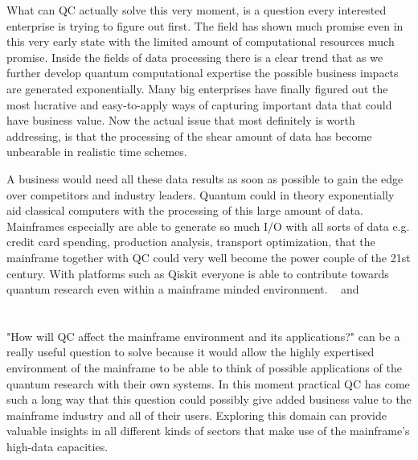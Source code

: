 What can QC actually solve this very moment, is a question every interested enterprise is trying to figure out first. The field has shown much promise even in this very early state with the limited amount of computational resources much promise. Inside the fields of data processing there is a clear trend that as we further develop quantum computational expertise the possible business impacts are generated exponentially. Many big enterprises have finally figured out the most lucrative and easy-to-apply ways of capturing important data that could have business value. Now the actual issue that most definitely is worth addressing, is that the processing of the shear amount of data has become unbearable in realistic time schemes.\autocite{Rieffel1998}

A business would need all these data results as soon as possible to gain the edge over competitors and industry leaders. Quantum could in theory exponentially aid classical computers with the processing of this large amount of data. Mainframes especially are able to generate so much I/O with all sorts of data e.g. credit card spending, production analysis, transport optimization, that the mainframe together with QC could very well become the power couple of the 21st century. With platforms such as Qiskit everyone is able to contribute towards quantum research even within a mainframe minded environment.  ~\autocite{Qiskit} and ~\autocite{Cirq}

\section{}
\label{sec:onderzoeksvraag}

"How will QC affect the mainframe environment and its applications?" can be a really useful question to solve because it would allow the highly expertised environment of the mainframe to be able to think of possible applications of the quantum research with their own systems. In this moment practical QC has come such a long way that this question could possibly give added business value to the mainframe industry and all of their users. Exploring this domain can provide valuable insights in all different kinds of sectors that make use of the mainframe's high-data capacities.

\section{}
\label{sec:onderzoeksdoelstelling}

